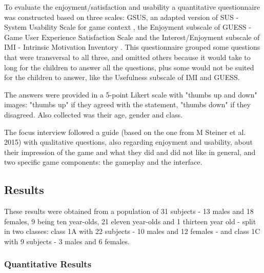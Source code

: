 \par To evaluate the enjoyment/satisfaction and usability a quantitative questionnaire was constructed based on three scales: GSUS, an adapted version of SUS - System Usability Scale for game context \cite{molnar_kostkova_2014}, the Enjoyment subscale of GUESS - Game User Experience Satisfaction Scale \cite{phan_keebler_chaparro_2016} and the Interest/Enjoyment subscale of IMI - Intrinsic Motivation Inventory \cite{wilde_et_al_2009}. This questionnaire grouped some questions that were transversal to all three, and omitted others because it would take to long for the children to answer all the questions, plus some would not be suited for the children to answer, like the Usefulness subscale of IMI and GUESS. \par The answers were provided in a 5-point Likert scale with "thumbs up and down" images: "thumbs up" if they agreed with the statement, "thumbs down" if they disagreed. Also collected was their age, gender and class.

\par The focus interview followed a guide (based on the one from M Steiner et al. 2015)\cite{steiner_at_al_2015} with qualitative questions, also regarding enjoyment and usability, about their impression of the game and what they did and did not like in general, and two specific game components: the gameplay and the interface.

\subsection{Results}

\par These results were obtained from a population of 31 subjects - 13 males and 18 females, 9 being ten year-olds, 21 eleven year-olds and 1 thirteen year old - split in two classes: class 1A with 22 subjects - 10 males and 12 females - and class 1C with 9 subjects - 3 males and 6 females. 

\subsubsection{Quantitative Results}

